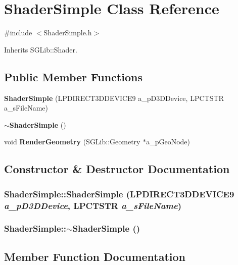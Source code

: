 \section{ShaderSimple Class Reference}
\label{class_shader_simple}


{\ttfamily \#include $<$ShaderSimple.h$>$}

Inherits SGLib::Shader.\subsection*{Public Member Functions}
\begin{DoxyCompactItemize}
\item 
{\bf ShaderSimple} (LPDIRECT3DDEVICE9 a\_\-pD3DDevice, LPCTSTR a\_\-sFileName)
\item 
{\bf $\sim$ShaderSimple} ()
\item 
void {\bf RenderGeometry} (SGLib::Geometry $\ast$a\_\-pGeoNode)
\end{DoxyCompactItemize}


\subsection{Constructor \& Destructor Documentation}
\subsubsection[{ShaderSimple}]{\setlength{\rightskip}{0pt plus 5cm}ShaderSimple::ShaderSimple (LPDIRECT3DDEVICE9 {\em a\_\-pD3DDevice}, \/  LPCTSTR {\em a\_\-sFileName})\hspace{0.3cm}{\ttfamily  [inline]}}\label{class_shader_simple_a4e04ff158d2c7a9de5239c103e26792e}
\subsubsection[{$\sim$ShaderSimple}]{\setlength{\rightskip}{0pt plus 5cm}ShaderSimple::$\sim$ShaderSimple ()\hspace{0.3cm}{\ttfamily  [inline]}}\label{class_shader_simple_a5360a87c84831cd589af944d003923fb}


\subsection{Member Function Documentation}
